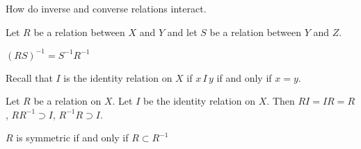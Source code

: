 

How do inverse and converse relations interact.


Let $R$ be a relation between $X$ and $Y$ and let $S$ be a relation between $Y$ and $Z$.

\begin{proposition}
  $(RS)^{-1} = S^{-1}R^{-1}$
\end{proposition}


Recall that $I$ is the identity relation on $X$ if $x\,I\,y$ if and only if $x = y$.

\begin{proposition}
  Let $R$ be a relation on $X$.
  Let $I$ be the identity relation on $X$.
  Then $RI = IR = R$, $RR^{-1} \supset I$, $R^{-1}R \supset I$.
\end{proposition}


\begin{proposition}
$R$ is symmetric if and only if $R \subset R^{-1}$
\end{proposition}
